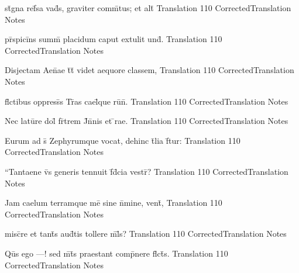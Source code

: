 \documentclass[]{book}
\begin{document}
\latline
  {st\={}gna ref\={}sa vad\={\macron {\i}}s, graviter comm\={}tus; et alt\={}}
  { Translation }
  {110}
  { CorrectedTranslation }
  { Notes }



\newpage

\latline
  {pr\={}spici\={}ns summ\={} placidum caput extulit und\={}.}
  { Translation }
  {110}
  { CorrectedTranslation }
  { Notes }


\latline
  {Disjectam Aen\={}ae t\={}t\={} videt aequore classem,}
  { Translation }
  {110}
  { CorrectedTranslation }
  { Notes }


\latline
  {fl\={}ctibus oppress\={}s Tr\={}as cael\={\macron {\i}}que ru\={\macron {\i}}n\={}.}
  { Translation }
  {110}
  { CorrectedTranslation }
  { Notes }



\newpage

\latline
  {Nec latu\={}re dol\={\macron {\i}} fr\={}trem J\={}n\={}nis et \={\macron {\i}}rae.}
  { Translation }
  {110}
  { CorrectedTranslation }
  { Notes }


\latline
  {Eurum ad s\={} Zephyrumque vocat, dehinc t\={}lia f\={}tur:}
  { Translation }
  {110}
  { CorrectedTranslation }
  { Notes }


\latline
  {``Tantaene v\={}s generis tennuit f\={\macron {\i}}d\={}cia vestr\={\macron {\i}}?}
  { Translation }
  {110}
  { CorrectedTranslation }
  { Notes }



\newpage

\latline
  {Jam caelum terramque me\={} sine n\={}mine, vent\={\macron {\i}},}
  { Translation }
  {110}
  { CorrectedTranslation }
  { Notes }


\latline
  {misc\={}re et tant\={}s aud\={}tis tollere m\={}l\={}s?}
  { Translation }
  {110}
  { CorrectedTranslation }
  { Notes }


\latline
  {Qu\={}s ego ---! sed m\={}t\={}s praestant comp\={}nere fl\={}ct\={}s.}
  { Translation }
  {110}
  { CorrectedTranslation }
  { Notes }
\end{document}
